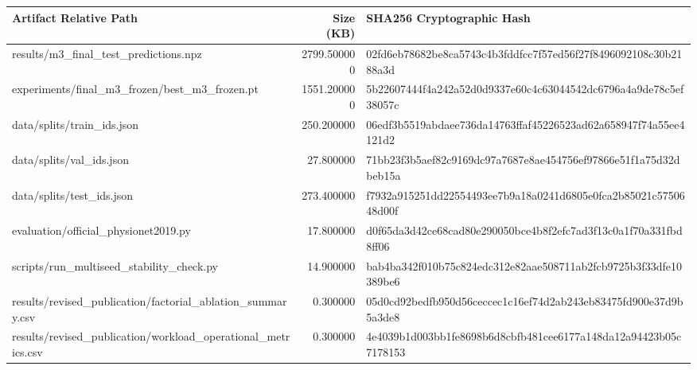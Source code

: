 \begin{tabular}{lrl}
\toprule
Artifact Relative Path & Size (KB) & SHA256 Cryptographic Hash \\
\midrule
results/m3_final_test_predictions.npz & 2799.500000 & 02fd6eb78682be8ca5743c4b3fddfcc7f57ed56f27f8496092108c30b2188a3d \\
experiments/final_m3_frozen/best_m3_frozen.pt & 1551.200000 & 5b22607444f4a242a52d0d9337e60c4c63044542dc6796a4a9de78c5ef38057c \\
data/splits/train_ids.json & 250.200000 & 06edf3b5519abdaee736da14763ffaf45226523ad62a658947f74a55ee4121d2 \\
data/splits/val_ids.json & 27.800000 & 71bb23f3b5aef82c9169dc97a7687e8ae454756ef97866e51f1a75d32dbeb15a \\
data/splits/test_ids.json & 273.400000 & f7932a915251dd22554493ee7b9a18a0241d6805e0fca2b85021c5750648d00f \\
evaluation/official_physionet2019.py & 17.800000 & d0f65da3d42ce68cad80e290050bce4b8f2efc7ad3f13c0a1f70a331fbd8ff06 \\
scripts/run_multiseed_stability_check.py & 14.900000 & bab4ba342f010b75c824edc312e82aae508711ab2fcb9725b3f33dfe10389be6 \\
results/revised_publication/factorial_ablation_summary.csv & 0.300000 & 05d0cd92bedfb950d56ceccec1c16ef74d2ab243eb83475fd900e37d9b5a3de8 \\
results/revised_publication/workload_operational_metrics.csv & 0.300000 & 4e4039b1d003bb1fe8698b6d8cbfb481cee6177a148da12a94423b05c7178153 \\
\bottomrule
\end{tabular}

